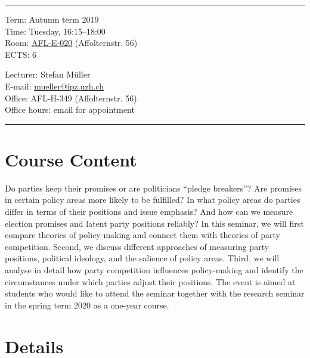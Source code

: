 \documentclass[abstract=on,parskip=full,headings=standardclasses,fontsize=11pt,paper=a4]{scrartcl}
\begin{document}
\hrule
\medskip
\begin{minipage}[t]{0.5\textwidth}
Term: Autumn term 2019 \\
Time: Tuesday, 16:15--18:00 \\
Room:  \href{https://www.plaene.uzh.ch/AFL}{AFL-E-020} (Affolternstr. 56) \\
ECTS: 6
\end{minipage}
\begin{minipage}[t]{0.49\textwidth}
\begin{flushright}
Lecturer: Stefan Müller \\
E-mail: \href{mailto:mueller@ipz.uzh.ch}{\textsf{mueller@ipz.uzh.ch}} \\
Office:  AFL-H-349 (Affolternstr. 56) \\
Office hours: email for appointment \\
\end{flushright}
\end{minipage}
\medskip
\vspace{2.5mm}
\hrule 

\section*{Course Content}

Do parties keep their promises or are politicians ``pledge breakers''? Are promises in certain policy areas more likely to be fulfilled? In what policy areas do parties differ in terms of their positions and issue emphasis? And how can we measure election promises and latent party positions reliably? In this seminar, we will first compare theories of policy-making and connect them with theories of party competition. Second, we discuss different approaches of measuring party positions, political ideology, and the salience of policy areas. Third, we will analyse in detail how party competition influences policy-making and identify the circumstances under which parties adjust their positions. The event is aimed at students who would like to attend the seminar together with the research seminar in the spring term 2020 as a one-year course.



\section*{Details}
\end{document}
